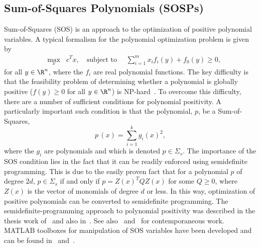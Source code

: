 \documentclass[9pt,journal,twocolumn]{IEEEtran}
\begin{document}
\subsection{Sum-of-Squares Polynomials (SOSPs)}\label{SOS_sec}

Sum-of-Squares (SOS) is an approach to  the optimization of positive polynomial variables. A typical formalism for the polynomial optimization problem is given by
\begin{align*}
&\max_x \; \; c^T x,\quad \text{subject to }\quad \sum_{i=1}^m x_i f_i(y)  + f_0(y) \ge 0,
\end{align*}
for all $y\in \R^n$, where the $f_i$ are real polynomial functions. The key difficulty is that the feasibility problem of determining whether a polynomial is globally positive ($f(y)\ge0$ for all $y\in \R^n$) is NP-hard~\cite{blum1998complexity}. To overcome this difficulty, there are a number of sufficient conditions for polynomial positivity. A particularly important such condition is that the polynomial, $p$, be a Sum-of-Squares,
\[
p\,(x)=\sum_{i=1}^k g_i(x)^2,
\]
where the $g_i$ are polynomials and which is denoted $p \in\Sigma_s$. The importance of the SOS condition lies in the fact that it can be readily enforced using semidefinite programming. This is due to the easily proven fact that for a polynomial $p$ of degree $2d$, $p \in \Sigma_s$ if and only if $p=Z(x)^T Q Z(x)$ for some $Q\ge 0$, where $Z(x)$ is the vector of monomials of degree $d$ or less. In this way, optimization of positive polynomials can be converted to semidefinite programming.
The semidefinite-programming approach to polynomial positivity was described in the thesis work of~\cite{parrilo2000structured} and also in~\cite{powers1998algorithm}. See also~\cite{chesi1999convexification} and~\cite{lasserre2001global} for contemporaneous work. MATLAB toolboxes for manipulation of SOS variables have been developed and can be found in~\cite{prajna2001introducing} and~\cite{henrion2003gloptipoly}.
\end{document}
